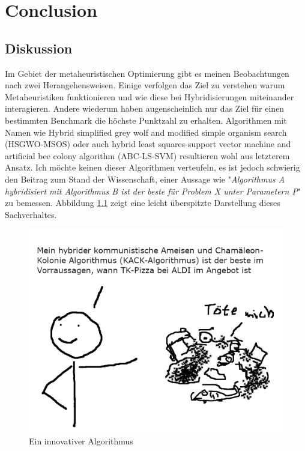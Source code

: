 \chapter{Conclusion}
\section*{Diskussion}
Im Gebiet der metaheuristischen Optimierung gibt es meinen Beobachtungen nach zwei Herangehensweisen. Einige verfolgen das Ziel zu verstehen warum Metaheuristiken funktionieren und wie diese bei Hybridisierungen miteinander interagieren. Andere wiederum haben augenscheinlich nur das Ziel für einen bestimmten Benchmark die höchste Punktzahl zu erhalten. Algorithmen mit Namen wie Hybrid simplified grey wolf and modified simple organism search (HSGWO-MSOS) oder auch hybrid least squares-support vector machine and artificial bee colony algorithm (ABC-LS-SVM) resultieren wohl aus letzterem Ansatz. Ich möchte keinen dieser Algorithmen verteufeln, es ist jedoch schwierig den Beitrag zum Stand der Wissenschaft, einer Aussage wie "\textit{Algorithmus A hybridisiert mit Algorithmus B ist der beste für Problem X unter Parametern P}" zu bemessen. Abbildung \ref*{fig:kack_algorithmus} zeigt eine leicht überspitzte Darstellung dieses Sachverhaltes.

\begin{figure}[h!]
    \includegraphics[scale=1.0]{images/KACK_Algorithmus.png}
    \caption{Ein innovativer Algorithmus}
    \label{fig:kack_algorithmus}
\end{figure}



